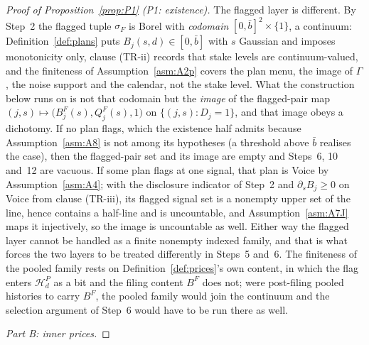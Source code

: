 \documentclass[11pt]{article}
\begin{document}
\begin{proof}[Proof of Proposition~\ref{prop:P1} (P1: existence)]
The flagged layer is different. By Step~2 the flagged tuple $\sigma_F$ is Borel with \emph{codomain}
$[0,\bar b]^2 \times \{1\}$, a continuum: Definition~\ref{def:plans} puts $B_j(s,d) \in [0,\bar b]$
with $s$ Gaussian and imposes monotonicity only, clause (TR-ii) records that stake levels are
continuum-valued, and the finiteness of Assumption~\ref{asm:A2p} covers the plan menu, the image of
$\Gamma$, the noise support and the calendar, not the stake level. What the construction below runs
on is not that codomain but the \emph{image} of the flagged-pair map
$(j,s) \mapsto \bigl(B_j^F(s),Q_j^F(s),1\bigr)$ on $\{(j,s) : D_j = 1\}$, and that image obeys a
dichotomy. If no plan flags, which the existence half admits because Assumption~\ref{asm:A8} is not
among its hypotheses (a threshold above $\bar b$ realises the case), then the flagged-pair set and
its image are empty and Steps~6, 10 and~12 are vacuous. If some plan flags at one signal, that plan
is Voice by Assumption~\ref{asm:A4}; with the disclosure indicator of Step~2 and
$\partial_s B_j \ge 0$ on Voice from clause (TR-iii), its flagged signal set is a nonempty upper set
of the line, hence contains a half-line and is uncountable, and Assumption~\ref{asm:A7J} maps it
injectively, so the image is uncountable as well. Either way the flagged layer cannot be handled as a
finite nonempty indexed family, and that is what forces the two layers to be treated differently in
Steps~5 and~6. The finiteness of the pooled family rests on Definition~\ref{def:prices}'s own
content, in which the flag enters $\mathcal H_d^P$ as a bit and the filing content $B^F$ does not;
were post-filing pooled histories to carry $B^F$, the pooled family would join the continuum and the
selection argument of Step~6 would have to be run there as well.

\medskip
\noindent\emph{Part B: inner prices.}


\end{proof}
\end{document}
